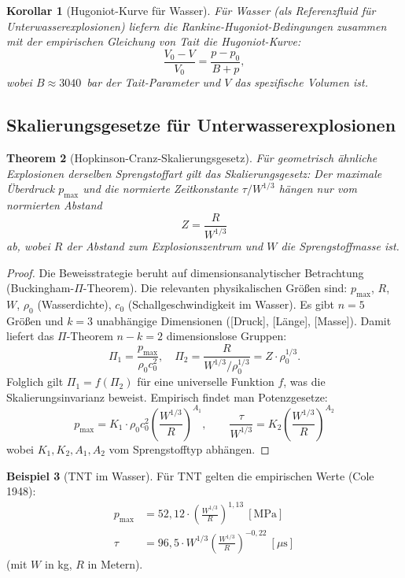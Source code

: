 ﻿\documentclass[12pt,a4paper]{article}
\newtheorem{theorem}{Theorem}[section]
\newtheorem{corollary}[theorem]{Korollar}
\theoremstyle{definition}
\newtheorem{example}[theorem]{Beispiel}
\theoremstyle{remark}
\begin{document}
\begin{corollary}[Hugoniot-Kurve für Wasser]
\label{cor:hugoniot}
Für Wasser (als Referenzfluid für Unterwasserexplosionen) liefern die Rankine-Hugoniot-Bedingungen zusammen mit der empirischen Gleichung von Tait die Hugoniot-Kurve:
\begin{equation}
\frac{V_0 - V}{V_0} = \frac{p - p_0}{B + p},
\label{eq:hugoniot_wasser}
\end{equation}
wobei $B \approx 3040$~bar der Tait-Parameter und $V$ das spezifische Volumen ist.
\end{corollary}

\subsection{Skalierungsgesetze für Unterwasserexplosionen}

\begin{theorem}[Hopkinson-Cranz-Skalierungsgesetz]
\label{thm:hopkinson}
Für geometrisch ähnliche Explosionen derselben Sprengstoffart gilt das Skalierungsgesetz: Der maximale Überdruck $p_{\max}$ und die normierte Zeitkonstante $\tau/W^{1/3}$ hängen nur vom normierten Abstand
\[
Z = \frac{R}{W^{1/3}}
\]
ab, wobei $R$ der Abstand zum Explosionszentrum und $W$ die Sprengstoffmasse ist.
\end{theorem}
\begin{proof}
Die Beweisstrategie beruht auf dimensionsanalytischer Betrachtung (Buckingham-$\Pi$-Theorem). Die relevanten physikalischen Größen sind: $p_{\max}$, $R$, $W$, $\rho_0$ (Wasserdichte), $c_0$ (Schallgeschwindigkeit im Wasser). Es gibt $n=5$ Größen und $k=3$ unabhängige Dimensionen ([Druck], [Länge], [Masse]). Damit liefert das $\Pi$-Theorem $n - k = 2$ dimensionslose Gruppen:
\[
\Pi_1 = \frac{p_{\max}}{\rho_0 c_0^2}, \quad \Pi_2 = \frac{R}{W^{1/3}/\rho_0^{1/3}} = Z\cdot\rho_0^{1/3}.
\]
Folglich gilt $\Pi_1 = f(\Pi_2)$ für eine universelle Funktion $f$, was die Skalierungsinvarianz beweist. Empirisch findet man Potenzgesetze:
\begin{equation}
p_{\max} = K_1 \cdot \rho_0 c_0^2 \left(\frac{W^{1/3}}{R}\right)^{A_1}, \qquad \frac{\tau}{W^{1/3}} = K_2 \left(\frac{W^{1/3}}{R}\right)^{A_2}
\end{equation}
wobei $K_1, K_2, A_1, A_2$ vom Sprengstofftyp abhängen. 
\end{proof}

\begin{example}[TNT im Wasser]
Für TNT gelten die empirischen Werte (Cole 1948):
\begin{align}
p_{\max} &= 52{,}12 \cdot \left(\frac{W^{1/3}}{R}\right)^{1{,}13}~[\text{MPa}]\\
\tau &= 96{,}5 \cdot W^{1/3} \left(\frac{W^{1/3}}{R}\right)^{-0{,}22}~[\mu\text{s}]
\end{align}
(mit $W$ in kg, $R$ in Metern).
\end{example}
\end{document}
